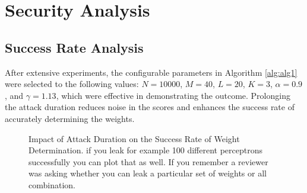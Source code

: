 
\section{Security Analysis}

\subsection{Success Rate Analysis}
After extensive experiments, the configurable parameters in Algorithm \ref{alg:alg1} were selected to the following values: \(N=10000\), \(M=40\), \(L=20\), \(K=3\), \(\alpha=0.9\), and \(\gamma=1.13\), which were effective in demonstrating the outcome. Prolonging the attack duration reduces noise in the scores and enhances the success rate of accurately determining the weights. 


\begin{figure}[h!]
\centering
{}
\caption{Impact of Attack Duration on the Success Rate of Weight Determination.  if you leak for example 100 different perceptrons successfully you can plot that as well. If you remember a reviewer was asking whether you can leak a particular set of weights or all  combination.}
\label{fig:ML_SuccessRate}
\end{figure}

